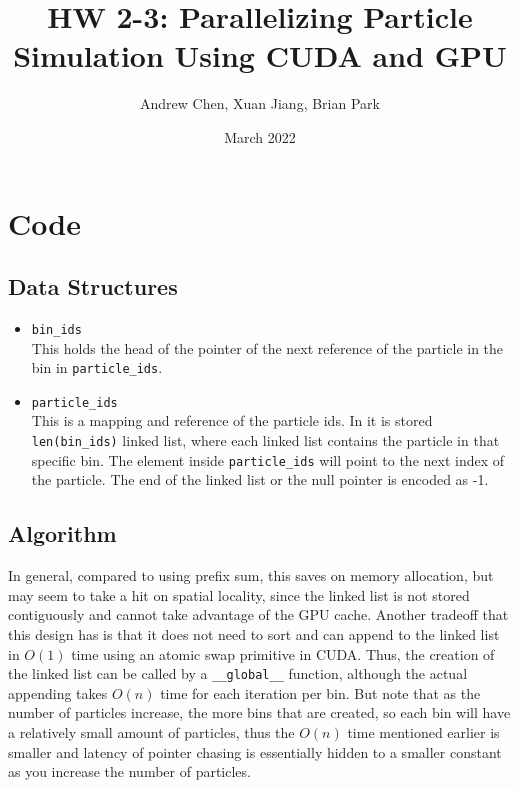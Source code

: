 \documentclass{article}
\title{HW 2-3: Parallelizing Particle Simulation Using CUDA and GPU}
\author{Andrew Chen, Xuan Jiang, Brian Park}
\date{March 2022}
\begin{document}
\maketitle

\section{Code}
\subsection{Data Structures}
\begin{itemize}
    \item \verb|bin_ids| \\
        This holds the head of the pointer of the next reference of the particle in the bin in \verb|particle_ids|.
    \item \verb|particle_ids| \\
        This is a mapping and reference of the particle ids. In it is stored \verb|len(bin_ids)| linked list, where each linked list contains the particle in that specific bin. The element inside \verb|particle_ids| will point to the next index of the particle. The end of the linked list or the null pointer is encoded as -1.
    
\end{itemize}

\subsection{Algorithm}
In general, compared to using prefix sum, this saves on memory allocation, but may seem to take a hit on spatial locality, since the linked list is not stored contiguously and cannot take advantage of the GPU cache. Another tradeoff that this design has is that it does not need to sort and can append to the linked list in $O(1)$ time using an atomic swap primitive in CUDA. Thus, the creation of the linked list can be called by a \verb|__global__| function, although the actual appending takes $O(n)$ time for each iteration per bin. But note that as the number of particles increase, the more bins that are created, so each bin will have a relatively small amount of particles, thus the $O(n)$ time mentioned earlier is smaller and latency of pointer chasing is essentially hidden to a smaller constant as you increase the number of particles. 
\end{document}
